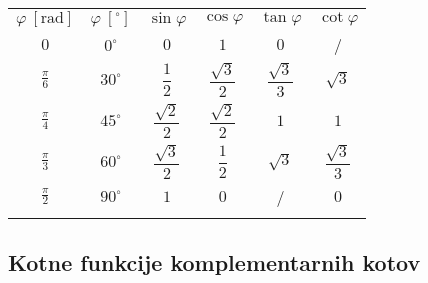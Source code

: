             
            
                \begin{table}
                    \centering
                    \addtolength{\tabcolsep}{8pt}
                    \renewcommand{\arraystretch}{2.15}                
                    \begin{tabular}{||c|c||c|c|c|c||} 
                        \hhline{|t:==:t:====:t|}
                        \rowcolor[rgb]{0.863,0.745,0.745}  
                                $\varphi~\left[\textrm{rad}\right] $ & $\varphi~\left[^\circ\right] $ & $\sin\varphi$ & $\cos\varphi$ & $\tan\varphi$ & $\cot\varphi$  \\ 
                        \hhline{|:==::====:|}
                                $0$ & $0^\circ$  & $0$ & $1$ & $0$ & /  \\ 
                        \hline
                                $\frac{\pi}{6}$ & $30^\circ$ & $\dfrac{1}{2}$ & $\dfrac{\sqrt{3}}{2}$ & $\dfrac{\sqrt{3}}{3}$ & $\sqrt{3}$  \\ 
                        \hline
                                $\frac{\pi}{4}$ & $45^\circ$ & $\dfrac{\sqrt{2}}{2}$ & $\dfrac{\sqrt{2}}{2}$ & $1$ & $1$  \\ 
                        \hline
                                $\frac{\pi}{3}$ & $60^\circ$ & $\dfrac{\sqrt{3}}{2}$ & $\dfrac{1}{2}$ & $\sqrt{3}$ & $\dfrac{\sqrt{3}}{3}$  \\ 
                        \hline
                                $\frac{\pi}{2}$ & $90^\circ$ & $1$ & $0$ & / & $0$  \\  
                        \hhline{|b:==:b:====:b|}
                    \end{tabular}
                \end{table}
            
        

        
            \subsection{Kotne funkcije komplementarnih kotov}

